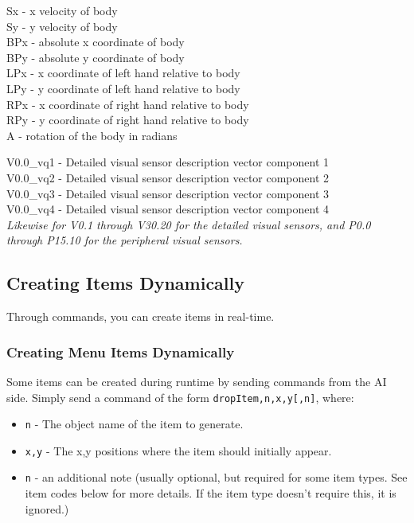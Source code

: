 \noindent Sx - x velocity of body\\
Sy - y velocity of body\\
BPx - absolute x coordinate of body\\
BPy - absolute y coordinate of body\\
LPx - x coordinate of left hand relative to body\\
LPy - y coordinate of left hand relative to body\\
RPx - x coordinate of right hand relative to body\\
RPy - y coordinate of right hand relative to body\\
A - rotation of the body in radians

\noindent V0.0\_vq1 - Detailed visual sensor description vector component 1\\
V0.0\_vq2 - Detailed visual sensor description vector component 2\\
V0.0\_vq3 - Detailed visual sensor description vector component 3\\
V0.0\_vq4 - Detailed visual sensor description vector component 4\\
\textit{Likewise for V0.1 through V30.20 for the detailed visual sensors, and P0.0 through P15.10 for the peripheral visual sensors.}





\subsection{Creating Items Dynamically}

Through commands, you can create items in real-time.

\subsubsection{Creating Menu Items Dynamically}

Some items can be created during runtime by sending commands from the AI side. Simply send a command of the form \texttt{dropItem,n,x,y[,n]}, where:

\begin{itemize}
\item \texttt{n} - The object name of the item to generate.
\item \texttt{x,y} - The x,y positions where the item should initially appear.
\item \texttt{n} - an additional note (usually optional, but required for some item types. See item codes below for more details. If the item type doesn't require this, it is ignored.)
\end{itemize}

